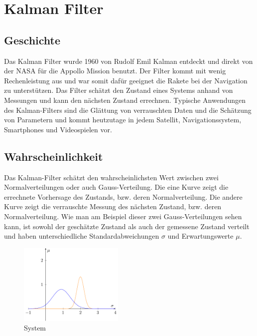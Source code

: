 %
%
%
%
%
%






\section{Kalman Filter}
\subsection{Geschichte}
Das Kalman Filter wurde 1960 von Rudolf Emil Kalman entdeckt und direkt von der NASA für die Appollo Mission benutzt. Der Filter kommt mit wenig Rechenleistung aus und war somit dafür geeignet die Rakete bei der Navigation zu unterstützen. Das Filter schätzt den Zustand eines Systems anhand von Messungen und kann den nächsten Zustand errechnen. Typische Anwendungen des Kalman-Filters sind die Glättung von verrauschten Daten und die Schätzung von Parametern und kommt heutzutage in jedem Satellit, Navigationssystem, Smartphones und Videospielen vor.

\subsection{Wahrscheinlichkeit}
Das Kalman-Filter schätzt den wahrscheinlichsten Wert zwischen zwei Normalverteilungen oder auch Gauss-Verteilung. Die eine Kurve zeigt die errechnete Vorhersage des Zustands, bzw. deren Normalverteilung. Die andere Kurve zeigt die verrauschte Messung des nächsten Zustand, bzw. deren Normalverteilung. Wie man am Beispiel dieser zwei Gauss-Verteilungen sehen kann, ist sowohl der geschätzte Zustand als auch der gemessene Zustand verteilt und haben unterschiedliche Standardabweichungen $\sigma$ und Erwartungswerte $\mu$.



\begin{figure}
 \begin{center}
 \includegraphics[width=5cm]{papers/erdbeben/Gausskurve2.pdf}
 \caption{System}
 \end{center}
\end{figure}



